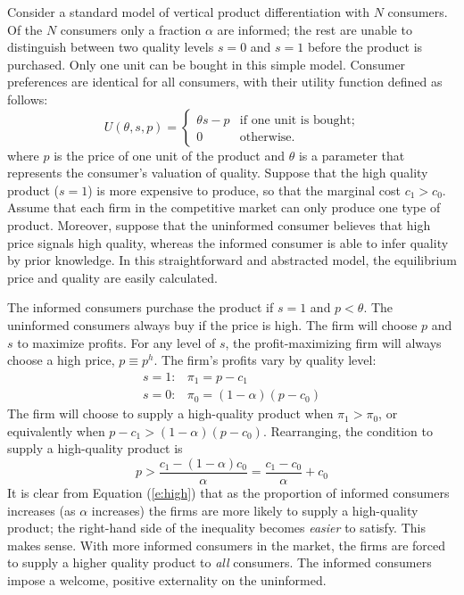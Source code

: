 \documentclass{article}
\begin{document}
Consider a standard model of vertical product differentiation with $N$ consumers.  Of the $N$ consumers only a fraction $\alpha$ are informed; the rest are unable to distinguish between two quality levels $s=0$ and $s=1$ before the product is purchased.  Only one unit can be bought in this simple model.  Consumer preferences are identical for all consumers, with their utility function defined as follows:
\begin{equation}
U(\theta, s, p) = \left\{
  \begin{array}{ll}
        \theta s - p  & \mbox{if one unit is bought};\\
        0 & \mbox{otherwise}.
  \end{array} \right.
\end{equation}
where $p$ is the price of one unit of the product and $\theta$ is a parameter that represents the consumer's valuation of quality.  Suppose that the high quality product ($s=1$) is more expensive to produce, so that the marginal cost $c_1 > c_0$.  Assume that each firm in the competitive market can only produce one type of product.   Moreover, suppose that the uninformed consumer believes that high price signals high quality, whereas the informed consumer is able to infer quality by prior knowledge.  In this straightforward and abstracted model, the equilibrium price and quality are easily calculated.  

The informed consumers purchase the product if $s = 1$ and $p < \theta$.  The uninformed consumers always buy if the price is high.  The firm will choose $p$ and $s$ to maximize profits.  For any level of $s$, the profit-maximizing firm will always choose a high price, $p \equiv p^h$.  The firm's profits vary by quality level:
\[
\begin{array}{ll}
  s = 1: & \pi_1 = p - c_1 \\
  s = 0: & \pi_0 = (1 - \alpha)(p - c_0)
\end{array}
\]
The firm will choose to supply a high-quality product when $\pi_1 > \pi_0$, or equivalently when $p- c_1 > (1 - \alpha)(p - c_0)$.  Rearranging, the condition to supply a high-quality product is 
\begin{equation}
\label{e:high}
p > \frac{c_1 - (1-\alpha)c_0}{\alpha} = \frac{c_1 - c_0}{\alpha} + c_0
\end{equation}
It is clear from Equation (\ref{e:high}) that as the proportion of informed consumers increases (as $\alpha$ increases) the firms are more likely to supply a high-quality product; the right-hand side of the inequality becomes \emph{easier} to satisfy.  This makes sense.  With more informed consumers in the market, the firms are forced to supply a higher quality product to \emph{all} consumers.  The informed consumers impose a welcome, positive externality on the uninformed.
\end{document}
